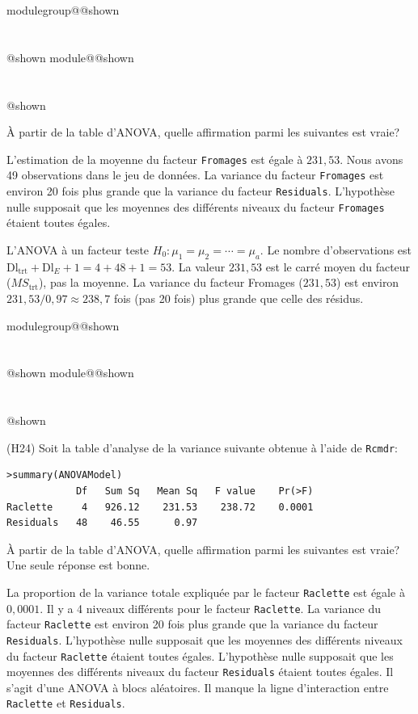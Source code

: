 \documentclass{Evaluation}
\makeatletter
\newcommand{\currentmodulekey}{}
\newcommand{\currentmoduletitle}{}
\newcommand{\currentgroupkey}{}
\newcommand{\currentgrouptitle}{}
\newcommand{\showmoduleifneeded}{%
  \ifx\currentgroupkey\empty\else
    \expandafter\ifx\csname modulegroup@\currentgroupkey @shown\endcsname\relax
      \section*{\currentgrouptitle}%
      \expandafter\gdef\csname modulegroup@\currentgroupkey @shown\endcsname{1}%
    \fi
  \fi
  \expandafter\ifx\csname module@\currentmodulekey @shown\endcsname\relax
    \section*{\currentmoduletitle}%
    \expandafter\gdef\csname module@\currentmodulekey @shown\endcsname{1}%
  \fi
}
\newenvironment{A23}{\showmoduleifneeded}{}
\newenvironment{H24}{\showmoduleifneeded}{}
\makeatother
\begin{document}
\begin{questions}
\begin{A23}
À partir de la table d'ANOVA, quelle affirmation parmi les suivantes est vraie?

\begin{checkboxes}
\choice L'estimation de la moyenne du facteur \texttt{Fromages} est égale à $231,53$. 
\choice Nous avons 49 observations dans le jeu de données.
\choice La variance du facteur \texttt{Fromages} est environ 20 fois plus grande que la variance du facteur \texttt{Residuals}.
\correctchoice L'hypothèse nulle supposait que les moyennes des différents niveaux du facteur \texttt{Fromages} étaient toutes égales.
\end{checkboxes}

\begin{solution}
L'ANOVA à un facteur teste $H_0\!: \mu_1=\mu_2=\cdots=\mu_a$. Le nombre d'observations est $\text{Dl}_{\text{trt}}+\text{Dl}_E+1 = 4+48+1 = 53$. La valeur $231{,}53$ est le carré moyen du facteur ($MS_{\text{trt}}$), pas la moyenne. La variance du facteur Fromages ($231{,}53$) est environ $231{,}53/0{,}97 \approx 238{,}7$ fois (pas 20 fois) plus grande que celle des résidus.
\end{solution}
\end{A23}

\begin{H24}
\question (H24) Soit la table d'analyse de la variance suivante obtenue à l'aide de \texttt{Rcmdr}:
\begin{verbatim}
>summary(ANOVAModel)
            Df   Sum Sq   Mean Sq   F value    Pr(>F)    
Raclette     4   926.12    231.53    238.72    0.0001 
Residuals   48    46.55      0.97                      
\end{verbatim}

À partir de la table d'ANOVA, quelle affirmation parmi les suivantes est vraie? Une seule réponse est bonne.

\begin{checkboxes}
\choice La proportion de la variance totale expliquée par le facteur \texttt{Raclette} est égale à $0,0001$. 
\choice Il y a 4 niveaux différents pour le facteur \texttt{Raclette}.
\choice La variance du facteur \texttt{Raclette} est environ 20 fois plus grande que la variance du facteur \texttt{Residuals}.
\correctchoice L'hypothèse nulle supposait que les moyennes des différents niveaux du facteur \texttt{Raclette} étaient toutes égales.
\choice L'hypothèse nulle supposait que les moyennes des différents niveaux du facteur \texttt{Residuals} étaient toutes égales.
\choice Il s'agit d'une ANOVA à blocs aléatoires.
\choice Il manque la ligne d'interaction entre \texttt{Raclette} et \texttt{Residuals}.
\end{checkboxes}


\end{H24}
\end{questions}
\end{document}
